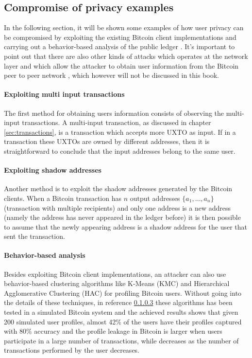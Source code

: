 \subsection{Compromise of privacy examples} In the following section, it will be
shown some examples of how user privacy can be compromised by exploiting the
existing Bitcoin client implementations and carrying out a behavior-based
analysis of the public ledger \cite{karame2016bitcoin}. It's important to point
out that there are also other kinds of attacks which operates at the network
layer and which allow the attacker to obtain user information from the Bitcoin
peer to peer network \cite{karame2016bitcoin}, which however will not be
discussed in this book.

\paragraph{Exploiting multi input transactions} The first method for obtaining
users information consists of observing the multi-input transactions. A
multi-input transaction, as discussed in chapter \ref{sec:transactions}, is a
transaction which accepts more UXTO as input. If in a transaction these UXTOs
are owned by different addresses, then it is straightforward to conclude that
the input addresses belong to the same user.

\paragraph{Exploiting shadow addresses} Another method is to exploit the shadow
addresses generated by the Bitcoin clients. When a Bitcoin transaction has $n$
output addresses $\{a_1 , \dots, a_n \}$ (transaction with multiple recipients)
and only one address is a new address (namely the address has never appeared in
the ledger before) it is then possible to assume that the newly appearing
address is a shadow address for the user that sent the transaction.

\paragraph{Behavior-based analysis} Besides exploiting Bitcoin client
implementations, an attacker can also use behavior-based clustering algorithms
like K-Means (KMC) and Hierarchical Agglomerative Clustering (HAC) for profiling
Bitcoin users. Without going into the details of these techniques, in reference
\ref{} these algorithms has been tested in a simulated Bitcoin system and the
achieved results shows that given 200 simulated user profiles, almost 42\% of
the users have their profiles captured with 80\% accuracy and the profile
leakage in Bitcoin is larger when users participate in a large number of
transactions, while decreases as the number of transactions performed by the
user decreases.

